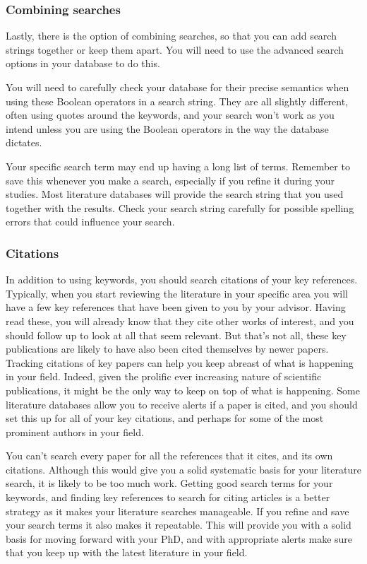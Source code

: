 \documentclass[
]{krantz}
\begin{document}
\hypertarget{combining-searches}{%
\subsubsection{Combining searches}\label{combining-searches}}

Lastly, there is the option of combining searches, so that you can add search strings together or keep them apart. You will need to use the advanced search options in your database to do this.

You will need to carefully check your database for their precise semantics when using these Boolean operators in a search string. They are all slightly different, often using quotes around the keywords, and your search won't work as you intend unless you are using the Boolean operators in the way the database dictates.

Your specific search term may end up having a long list of terms. Remember to save this whenever you make a search, especially if you refine it during your studies. Most literature databases will provide the search string that you used together with the results. Check your search string carefully for possible spelling errors that could influence your search.

\hypertarget{citations-1}{%
\subsubsection{Citations}\label{citations-1}}

In addition to using keywords, you should search citations of your key references. Typically, when you start reviewing the literature in your specific area you will have a few key references that have been given to you by your advisor. Having read these, you will already know that they cite other works of interest, and you should follow up to look at all that seem relevant. But that's not all, these key publications are likely to have also been cited themselves by newer papers. Tracking citations of key papers can help you keep abreast of what is happening in your field. Indeed, given the prolific ever increasing nature of scientific publications, it might be the only way to keep on top of what is happening. Some literature databases allow you to receive alerts if a paper is cited, and you should set this up for all of your key citations, and perhaps for some of the most prominent authors in your field.

You can't search every paper for all the references that it cites, and its own citations. Although this would give you a solid systematic basis for your literature search, it is likely to be too much work. Getting good search terms for your keywords, and finding key references to search for citing articles is a better strategy as it makes your literature searches manageable. If you refine and save your search terms it also makes it repeatable. This will provide you with a solid basis for moving forward with your PhD, and with appropriate alerts make sure that you keep up with the latest literature in your field.
\end{document}
